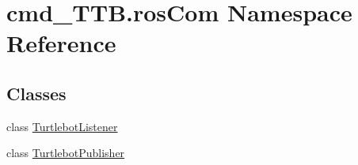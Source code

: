 \hypertarget{namespacecmd__TTB_1_1rosCom}{}\section{cmd\+\_\+\+T\+T\+B.\+ros\+Com Namespace Reference}
\label{namespacecmd__TTB_1_1rosCom}
\subsection*{Classes}
\begin{DoxyCompactItemize}
\item 
class \hyperlink{classcmd__TTB_1_1rosCom_1_1TurtlebotListener}{Turtlebot\+Listener}
\item 
class \hyperlink{classcmd__TTB_1_1rosCom_1_1TurtlebotPublisher}{Turtlebot\+Publisher}
\end{DoxyCompactItemize}
